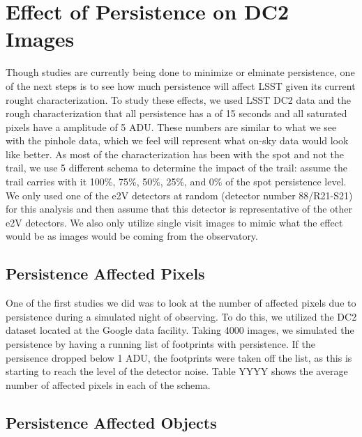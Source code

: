 \documentclass[DM,authoryear,toc]{lsstdoc}
\begin{document}
\section{Effect of Persistence on DC2 Images}

Though studies are currently being done to minimize or elminate persistence, one of the next steps is to see how much persistence will affect LSST given its current rought characterization.
To study these effects, we used LSST DC2 data and the rough characterization that all persistence has a \textit{\tau} of 15 seconds and all saturated pixels have a amplitude of 5 ADU\@.
These numbers are similar to what we see with the pinhole data, which we feel will represent what on-sky data would look like better.
As most of the characterization has been with the spot and not the trail, we use 5 different schema to determine the impact of the trail: assume the trail carries with it 100\%, 75\%, 50\%, 25\%, and 0\% of the spot persistence level.
We only used one of the e2V detectors at random (detector number 88/R21-S21) for this analysis and then assume that this detector is representative of the other e2V detectors.
We also only utilize single visit images to mimic what the effect would be as images would be coming from the observatory.

\subsection{Persistence Affected Pixels}

One of the first studies we did was to look at the number of affected pixels due to persistence during a simulated night of observing.
To do this, we utilized the DC2 dataset located at the Google data facility.
Taking 4000 images, we simulated the persistence by having a running list of footprints with persistence.
If the persisence dropped below 1 ADU, the footprints were taken off the list, as this is starting to reach the level of the detector noise.
Table YYYY shows the average number of affected pixels in each of the schema.

  



\subsection{Persistence Affected Objects}
\end{document}
